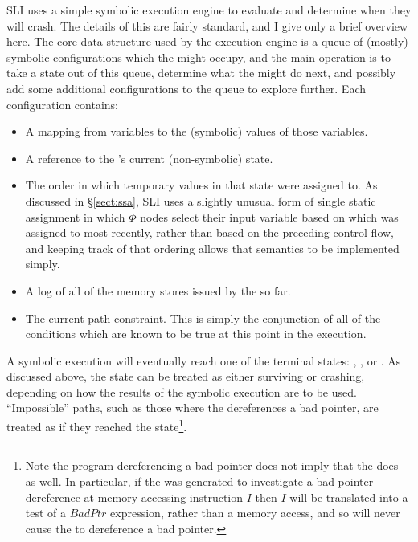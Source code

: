 SLI uses a simple symbolic execution engine to evaluate
{\StateMachines} and determine when they will crash.  The details of
this are fairly standard, and I give only a brief overview
here.  The core data structure
used by the execution engine is a queue of (mostly) symbolic
configurations which the {\StateMachine} might occupy, and the main
operation is to take a state out of this queue, determine what the
\StateMachine might do next, and possibly add some additional
configurations to the queue to explore further.  Each configuration
contains:

\begin{itemize}
\item
  A mapping from {\StateMachine} variables to the (symbolic) values of
  those variables.
\item
  A reference to the {\StateMachine}'s current (non-symbolic) state.
\item
  The order in which temporary values in that state were assigned to.
  As discussed in \S\ref{sect:ssa}, SLI uses a slightly unusual form
  of single static assignment in which $\Phi$ nodes select their input
  variable based on which was assigned to most recently, rather than
  based on the preceding control flow, and keeping track of that
  ordering allows that semantics to be implemented simply.
\item
  A log of all of the memory stores issued by the \StateMachine so far.
\item
  The current path constraint.  This is simply the conjunction of all
  of the conditions which are known to be true at this point in the
  execution.
\end{itemize}

A symbolic execution will eventually reach one of the {\StateMachine}
terminal states: , , or .
As discussed above, the  state can be treated as
either surviving or crashing, depending on how the results of the
symbolic execution are to be used.  ``Impossible'' paths, such as
those where the {\StateMachine} dereferences a bad pointer, are
treated as if they reached the  state\footnote{Note
  the program dereferencing a bad pointer does not imply that the
  {\StateMachine} does as well.  In particular, if the {\StateMachine}
  was generated to investigate a bad pointer dereference at memory
  accessing-instruction $I$ then $I$ will be translated into a test of
  a $BadPtr$ expression, rather than a memory access, and so will
  never cause the {\StateMachine} to dereference a bad
  pointer.}.

